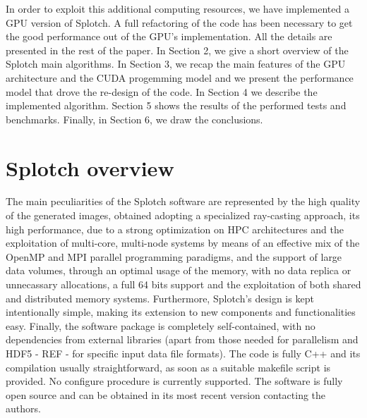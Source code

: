 \documentclass[11pt]{article}
\begin{document}
In order to exploit this additional computing resources, we have implemented 
a GPU version of Splotch. A full refactoring of the code has been necessary 
to get the good performance out of the GPU's implementation. 
All the details are presented in the rest of the paper. In Section 2, we give a short 
overview of the Splotch main algorithms. In Section 3, we recap the main features
of the GPU architecture and the CUDA progemming model
and we present the performance model that drove the 
re-design of the code. In Section 4 
we describe the implemented algorithm. Section 5 shows
the results of the performed tests and benchmarks. Finally, in Section 6, we draw 
the conclusions. 

\section{Splotch overview}

The main peculiarities of the Splotch software are represented by the 
high quality of the generated images, obtained adopting a specialized ray-casting 
approach, its high performance, due to a strong optimization on HPC architectures and the exploitation of multi-core, multi-node 
systems by means of an effective mix of the OpenMP and MPI parallel programming paradigms, and
the support of large data volumes, through an optimal usage of the memory, with
no data replica or unnecassary allocations, a full 64 bits support and the exploitation
of both shared and distributed memory systems. Furthermore, Splotch's design is kept 
intentionally simple, making its extension to new components and functionalities easy. 
Finally, the software package is completely self-contained, with no dependencies from external 
libraries (apart from those needed for parallelism and HDF5 - REF - for
specific input data file formats). The code is fully C++ and its compilation
usually straightforward, as soon as a suitable makefile script is provided.
No configure procedure is currently supported. The software is fully open source and 
can be obtained in its most recent version contacting the authors.
\end{document}
